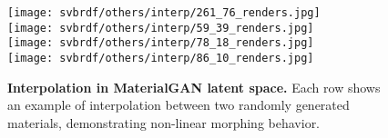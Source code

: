 \begin{figure}[h]
	\centering
	\setlength{\resLen}{5.in}
	\addtolength{\tabcolsep}{0pt}
	\texttt{[image: svbrdf/others/interp/261\_76\_renders.jpg]}\\[2pt]
	\texttt{[image: svbrdf/others/interp/59\_39\_renders.jpg]}\\[2pt]
	\texttt{[image: svbrdf/others/interp/78\_18\_renders.jpg]}\\[2pt]
	\texttt{[image: svbrdf/others/interp/86\_10\_renders.jpg]}
	\caption[Interpolation in MaterialGAN latent space]{\label{fig:svbrdf:morph_fake}
		\textbf{Interpolation in MaterialGAN latent space.} Each row shows an example of interpolation between two randomly generated materials, demonstrating non-linear morphing behavior.
	}
\end{figure}
